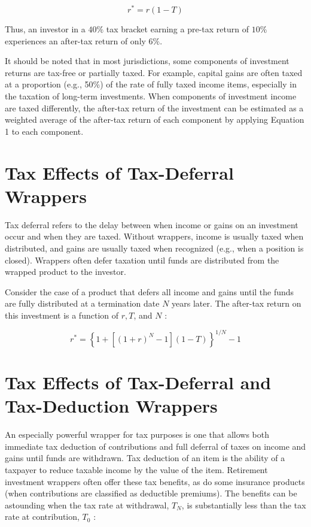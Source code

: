 \documentclass[11pt]{article}
\begin{document}
\begin{equation*}
r^{*}=r(1-T) \tag{1}
\end{equation*}


Thus, an investor in a $40 \%$ tax bracket earning a pre-tax return of $10 \%$ experiences an after-tax return of only $6 \%$.

It should be noted that in most jurisdictions, some components of investment returns are tax-free or partially taxed. For example, capital gains are often taxed at a proportion (e.g., 50\%) of the rate of fully taxed income items, especially in the taxation of long-term investments. When components of investment income are taxed differently, the after-tax return of the investment can be estimated as a weighted average of the after-tax return of each component by applying Equation 1 to each component.

\section*{Tax Effects of Tax-Deferral Wrappers}
Tax deferral refers to the delay between when income or gains on an investment occur and when they are taxed. Without wrappers, income is usually taxed when distributed, and gains are usually taxed when recognized (e.g., when a position is closed). Wrappers often defer taxation until funds are distributed from the wrapped product to the investor.

Consider the case of a product that defers all income and gains until the funds are fully distributed at a termination date $N$ years later. The after-tax return on this investment is a function of $r, T$, and $N$ :


\begin{equation*}
r^{*}=\left\{1+\left[(1+r)^{N}-1\right](1-T)\right\}^{1 / N}-1 \tag{2}
\end{equation*}


\section*{Tax Effects of Tax-Deferral and Tax-Deduction Wrappers}
An especially powerful wrapper for tax purposes is one that allows both immediate tax deduction of contributions and full deferral of taxes on income and gains until funds are withdrawn. Tax deduction of an item is the ability of a taxpayer to reduce taxable income by the value of the item. Retirement investment wrappers often offer these tax benefits, as do some insurance products (when contributions are classified as deductible premiums). The benefits can be astounding when the tax rate at withdrawal, $T_{N}$, is substantially less than the tax rate at contribution, $T_{0}$ :
\end{document}
